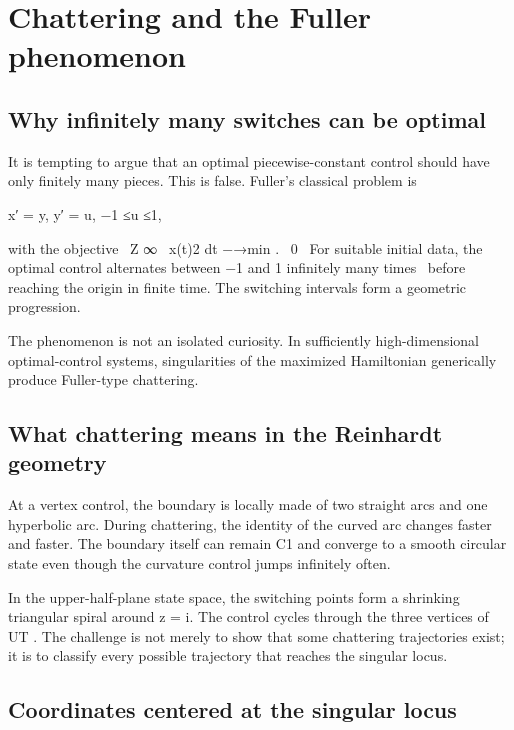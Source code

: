 \chapter{Chattering and the Fuller phenomenon}
\section{Why infinitely many switches can be optimal}

It is tempting to argue that an optimal piecewise-constant control should have only finitely many pieces. This is false. Fuller’s classical problem is


\begin{displaytext}
x′ = y, y′ = u, −1 ≤u ≤1,
\end{displaytext}

\begin{displaytext}
with the objective \
Z ∞ \
x(t)2 dt −→min . \
0 \
For suitable initial data, the optimal control alternates between −1 and 1 infinitely many times \
before reaching the origin in finite time. The switching intervals form a geometric progression.
\end{displaytext}

The phenomenon is not an isolated curiosity. In sufficiently high-dimensional optimal-control systems, singularities of the maximized Hamiltonian generically produce Fuller-type chattering.


\section{What chattering means in the Reinhardt geometry}

At a vertex control, the boundary is locally made of two straight arcs and one hyperbolic arc. During chattering, the identity of the curved arc changes faster and faster. The boundary itself can remain C1 and converge to a smooth circular state even though the curvature control jumps infinitely often.


In the upper-half-plane state space, the switching points form a shrinking triangular spiral around z = i. The control cycles through the three vertices of UT . The challenge is not merely to show that some chattering trajectories exist; it is to classify every possible trajectory that reaches the singular locus.


\section{Coordinates centered at the singular locus}

